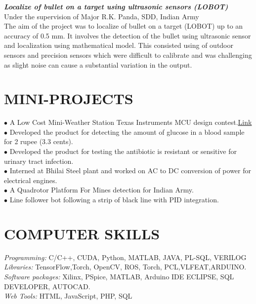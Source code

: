 \documentclass[a4paper,10pt]{article}
\begin{document}
  {\sl \textbf{Localize of bullet on a target using ultrasonic sensors (LOBOT)}}\\
  Under the supervision of Major R.K. Panda, SDD, Indian Army\\
The aim of the project was to localize of bullet on a target (LOBOT) up to an
accuracy of 0.5 mm. It involves the detection of the bullet using ultrasonic
sensor and localization using mathematical model. This consisted using of
outdoor sensors and precision sensors which were difficult to calibrate and was
challenging as slight noise can cause a substantial variation in the output.
 \section{MINI-PROJECTS} 
$\bullet$ A Low Cost Mini-Weather Station Texas Instruments MCU design contest.\href{http://www.youtube.com/watch?v=kyFDzlU89iE}{Link} \\
$\bullet$ Developed the product for detecting the amount of glucose in a blood sample for 2 rupee (3.3 cents). \\
$\bullet$  Developed the product for testing the antibiotic is resistant or sensitive for urinary tract infection.\\
$\bullet$ Interned at Bhilai Steel plant and worked on AC to DC conversion of power for electrical engines.\\
$\bullet$ A Quadrotor Platform For Mines detection for Indian Army.\\
$\bullet$ Line follower bot following a strip of black line with PID integration.\\
\section{COMPUTER SKILLS} 
{\sl Programming:}        C/C++, CUDA, Python, MATLAB, JAVA, PL-SQL, VERILOG\\
{\sl Libraries:        }      TensorFlow,Torch, OpenCV, ROS, Torch, PCL,VLFEAT,ARDUINO.\\
{\sl Software packages: }Xilinx, PSpice, MATLAB, Arduino IDE
                       ECLIPSE, SQL DEVELOPER, AUTOCAD.\\
{\sl Web Tools:          }  HTML, JavaScript, PHP, SQL \\
 
\end{document}
